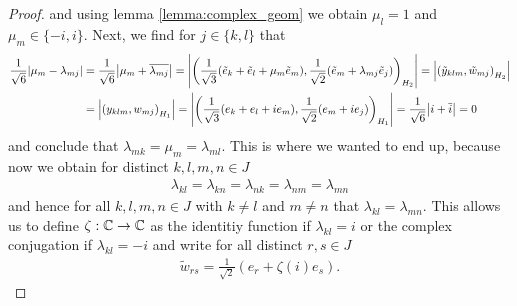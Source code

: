 \begin{proof}
	and using lemma \ref{lemma:complex_geom} we obtain $\mu_l = 1$ and $\mu_m \in \{-i, i\}$. Next, we find for $j \in \{k,l\}$ that
	\begin{align*}
		\frac{1}{\sqrt{6}} {\left | \mu_m - \lambda_{mj} \right |} &= \frac{1}{\sqrt{6}} {\left | \mu_m + \overline{\lambda_{mj}} \right |} = {\left | {\left ( \frac{1}{\sqrt{3}}(\tilde{e}_k + \tilde{e}_l + \mu_m \tilde{e}_m), \frac{1}{\sqrt{2}}(\tilde{e}_m + \lambda_{mj} \tilde{e}_j) \right )}_{H_2} \right |} = {\left | {\left ( \tilde{y}_{klm}, \tilde{w}_{mj} \right )}_{H_2} \right |} \\
		&= {\left | {\left ( y_{klm}, w_{mj} \right )}_{H_1} \right |} = {\left | {\left ( \frac{1}{\sqrt{3}}(e_k + e_l + ie_m), \frac{1}{\sqrt{2}}(e_m + ie_j) \right )}_{H_1} \right |} = \frac{1}{\sqrt{6}}{\left | i + \overline{i} \right |} = 0
	\end{align*}
	and conclude that $\lambda_{mk} = \mu_m = \lambda_{ml}$. This is where we wanted to end up, because now we obtain for distinct $k,l,m,n \in J$
	\begin{align*}
		\lambda_{kl} = \lambda_{kn} = \lambda_{nk} = \lambda_{nm} = \lambda_{mn}
	\end{align*}
	and hence for all $k,l,m,n \in J$ with $k \neq l$ and $m \neq n$ that $\lambda_{kl} = \lambda_{mn}$. This allows us to define $\zeta: \mathbb{C} \to \mathbb{C}$ as the identitiy function if $\lambda_{kl} = i$ or the complex conjugation if $\lambda_{kl} = -i$ and write for all distinct $r,s \in J$ 
	\begin{align*}
		\tilde{w}_{rs} = \frac{1}{\sqrt{2}}(e_r + \zeta(i) e_s).
	\end{align*}
	

\end{proof}
